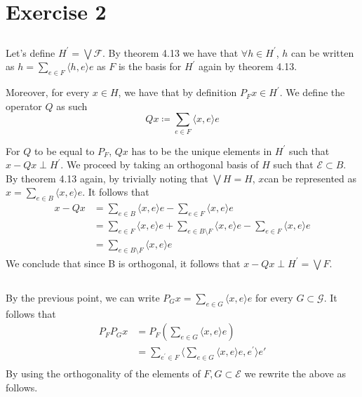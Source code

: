 \documentclass[a4paper,12pt]{article} %
\begin{document}
\section{Exercise 2}
\subsection{}
Let's define \(H^{\prime}  = \bigvee \mathcal{F}\). By theorem 4.13 we have that \(\forall h \in  H^{\prime} \), \(h\) can be written as \(h = \sum_{e \in  F} \langle h,e \rangle e  \) as \(F\) is the basis for \(H^{\prime} \) again by theorem 4.13.

Moreover, for every \(x \in H\), we have that by definition \(P_F x \in  H^{\prime} \).
We define the operator \(Q\) as such
\begin{equation}
    Qx \coloneqq \sum_{e \in  F}\langle x,e \rangle e
\end{equation}

For \(Q\) to be equal to \(P_F\), \(Qx \) has to be the unique elements in \(H^{\prime} \) such that \(x - Qx \perp H^{\prime} \).
We proceed by taking an orthogonal basis of \(H\) such that \(\mathcal{E} \subset B\).
By theorem 4.13 again, by trivially noting that \(\bigvee H = H\), \(x\)can be represented as \(x=\sum_{e\in B}\langle x,e \rangle e  \).
It follows that
\begin{align*}
    x-Qx & = \sum_{e \in  B}\langle x,e \rangle e - \sum_{e \in  F}\langle x,e \rangle e                                                   \\
         & =  \sum_{e \in F}\langle x,e \rangle e+ \sum_{e \in  B\setminus F}\langle x,e \rangle e  - \sum_{e \in  F}\langle x,e \rangle e \\
         & = \sum_{e \in  B\setminus F}\langle x,e \rangle e
\end{align*}
We conclude that since B is orthogonal, it follows that \(x-Qx \perp H^{\prime} = \bigvee F\).


\subsection{}
By the previous point, we can write \(P_G x = \sum_{e \in  G}\langle x,e \rangle e \) for every \(G \subset \mathcal{G}\).
It follows that
\begin{align*}
    P_F P_G x & = P_F \left( \sum_{e \in  G}\langle x,e \rangle e  \right)
    \\
              & =\sum_{e^{\prime}  \in F} \langle \sum_{e \in  G}\langle x,e \rangle e   ,e^{\prime} \rangle  e' \\
\end{align*}
By using the orthogonality of the elements of \(F,G \subset \mathcal{E}\) we rewrite the above as follows.
\end{document}
